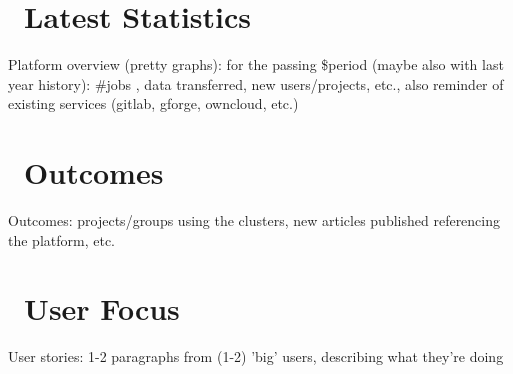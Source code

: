 \documentclass[a4paper]{article}
\begin{document}
\ulhpctoc

\begin{welcome}
  \lipsum[1]
\end{welcome}




\section{\faBarChart\ Latest Statistics}

Platform overview (pretty graphs): for the passing \$period (maybe also
with last year history): \#jobs , data transferred,  new users/projects,
etc., also reminder of existing services (gitlab, gforge, owncloud, etc.)

\newpage %
\section{\faShare\ Outcomes}

Outcomes: projects/groups using the clusters, new articles published
referencing the platform, etc.

\section{\faUser\ User Focus}

User stories: 1-2 paragraphs from (1-2) 'big' users, describing what
they're doing
\end{document}
